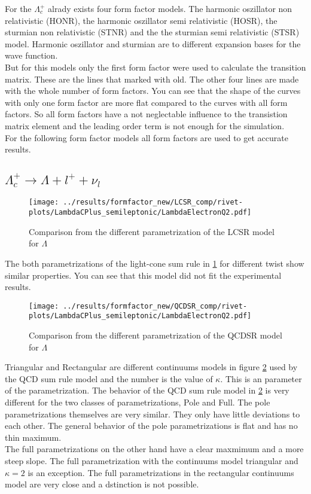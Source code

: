 For the \(\Lambda_c^+\) alrady exists four form factor models. The harmonic 
oszillator non relativistic (HONR), the harmonic oszillator semi relativistic 
(HOSR), the sturmian non relativistic (STNR) and the the sturmian semi 
relativistic (STSR) model. Harmonic oszillator and sturmian are to different 
expansion bases for the wave function. {\cite{prev}} \\
But for this models only the first form factor were used to calculate the 
transition matrix. These are the lines that marked with old. The other four 
lines are made with the whole number of form factors. You can see that the shape 
of the curves with only one form factor are more flat compared 
to the curves with all form factors. So all form factors have a not neglectable 
influence to the transistion matrix element and the leading order term is not 
enough for the simulation.\\ 
For the following form factor models all form factors are used to get accurate 
results.

\clearpage
\subsection{\(\Lambda_c^+ \rightarrow \Lambda + l^+ + \nu_l\)}
\begin{figure}[h]
  \centering
  \texttt{[image: ../results/formfactor\_new/LCSR\_comp/rivet-plots/LambdaCPlus\_semileptonic/LambdaElectronQ2.pdf]}
  \caption{Comparison from the different parametrization of the LCSR model for \(\Lambda\)} \label{gr:lcsr}
\end{figure}
The both parametrizations of the light-cone sum rule in {\ref{gr:lcsr}} for 
different twist show similar properties. You can see that this model did not 
fit the experimental results.\\


\begin{figure}[h]
  \centering
  \texttt{[image: ../results/formfactor\_new/QCDSR\_comp/rivet-plots/LambdaCPlus\_semileptonic/LambdaElectronQ2.pdf]}
  \caption{Comparison from the different parametrization of the QCDSR model for \(\Lambda\)} \label{gr:qcdsr}
\end{figure}
Triangular and Rectangular are different continuums models in figure 
{\ref{gr:qcdsr}} used by the QCD sum rule  model and the number is the value 
of \(\kappa\). This is an parameter of the parametrization.
The behavior of the QCD sum rule model  in {\ref{gr:qcdsr}} is very different 
for the two classes of parametrizations, Pole and Full. The pole 
parametrizations themselves are very similar. They only have little deviations 
to each other. The general behavior of the pole parametrizations is flat and 
has no thin maximum.\\ 
The full parametrizations on the other hand have a clear maxmimum and a more steep 
slope. The full parametrization with the continuums model triangular and \(\kappa = 2\) is an 
exception. The full parametrizations in the rectangular continuums model 
are very close and a dstinction is not possible.\\

